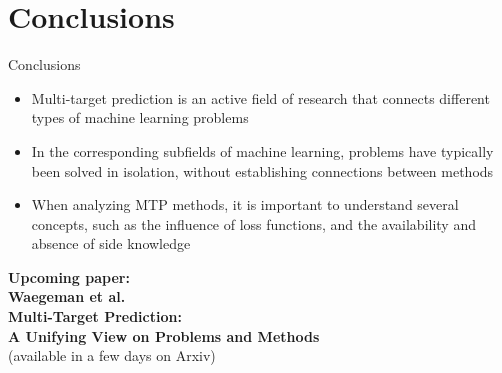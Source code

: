 \documentclass[]{beamer}
\renewcommand{\alert}[1]{\textbf{\color{putblue} #1}}
\begin{document}
%
%





\section{Conclusions}

\begin{frame}{Conclusions}

\begin{itemize}
\item Multi-target prediction is an active field of research that connects different types of machine learning problems
\item In the corresponding subfields of machine learning, problems have typically been solved in isolation, without establishing connections between methods
\item When analyzing MTP methods, it is important to understand several concepts, such as the influence of loss functions, and the availability and absence of side knowledge
\end{itemize}

\begin{center}
{\bf Upcoming paper: \\
Waegeman et al. \\ Multi-Target Prediction: \\ A Unifying View on Problems and Methods} \\
(available in a few days on Arxiv)

\end{center}

\end{frame}
\end{document}
